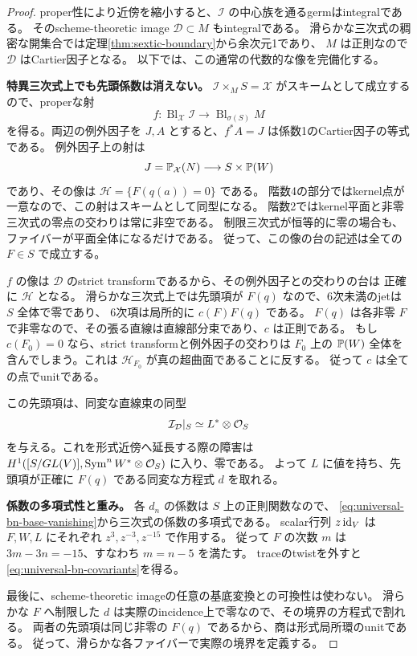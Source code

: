 \begin{proof}
proper性により近傍を縮小すると、$\mathcal I$ の中心族を通るgermはintegralである。
そのscheme-theoretic image $\mathcal D\subset M$ もintegralである。
滑らかな三次式の稠密な開集合では定理\ref{thm:sextic-boundary}から余次元1であり、
$M$ は正則なので $\mathcal D$ はCartier因子となる。
以下では、この通常の代数的な像を完備化する。

\textbf{特異三次式上でも先頭係数は消えない。}
$\mathcal I\times_MS=\mathcal X$ がスキームとして成立するので、properな射
\[
 f:\operatorname{Bl}_{\mathcal X}\mathcal I
           \longrightarrow\operatorname{Bl}_{\sigma(S)}M
\]
を得る。両辺の例外因子を $J,A$ とすると、$f^*A=J$ は係数1のCartier因子の等式である。
例外因子上の射は
\[
 J=\mathbb P_{\mathcal X}(N)\longrightarrow S\times\mathbb P(W)
\]
であり、その像は $\mathcal H=\{F(q(a))=0\}$ である。
階数4の部分ではkernel点が一意なので、この射はスキームとして同型になる。
階数2ではkernel平面と非零三次式の零点の交わりは常に非空である。
制限三次式が恒等的に零の場合も、ファイバーが平面全体になるだけである。
従って、この像の台の記述は全ての $F\in S$ で成立する。

$f$ の像は $\mathcal D$ のstrict transformであるから、その例外因子との交わりの台は
正確に $\mathcal H$ となる。
滑らかな三次式上では先頭項が $F(q)$ なので、6次未満のjetは $S$ 全体で零であり、
6次項は局所的に $c(F)F(q)$ である。
$F(q)$ は各非零 $F$ で非零なので、その張る直線は直線部分束であり、$c$ は正則である。
もし $c(F_0)=0$ なら、strict transformと例外因子の交わりは $F_0$ 上の
$\mathbb P(W)$ 全体を含んでしまう。これは $\mathcal H_{F_0}$ が真の超曲面であることに反する。
従って $c$ は全ての点でunitである。

この先頭項は、同変な直線束の同型
\[
                    \mathcal I_{\mathcal D}|_S\simeq L^*\otimes\mathcal O_S
\]
を与える。これを形式近傍へ延長する際の障害は
$H^1([S/GL(V)],\operatorname{Sym}^nW^*\otimes\mathcal O_S)$ に入り、零である。
よって $L$ に値を持ち、先頭項が正確に $F(q)$ である同変な方程式 $d$ を取れる。

\textbf{係数の多項式性と重み。}
各 $d_n$ の係数は $S$ 上の正則関数なので、
\eqref{eq:universal-bn-base-vanishing}から三次式の係数の多項式である。
scalar行列 $z\operatorname{id}_V$ は $F,W,L$ にそれぞれ $z^3,z^{-3},z^{-15}$ で作用する。
従って $F$ の次数 $m$ は $3m-3n=-15$、すなわち $m=n-5$ を満たす。
traceのtwistを外すと\eqref{eq:universal-bn-covariants}を得る。

最後に、scheme-theoretic imageの任意の基底変換との可換性は使わない。
滑らかな $F$ へ制限した $d$ は実際のincidence上で零なので、その境界の方程式で割れる。
両者の先頭項は同じ非零の $F(q)$ であるから、商は形式局所環のunitである。
従って、滑らかな各ファイバーで実際の境界を定義する。
\end{proof}

